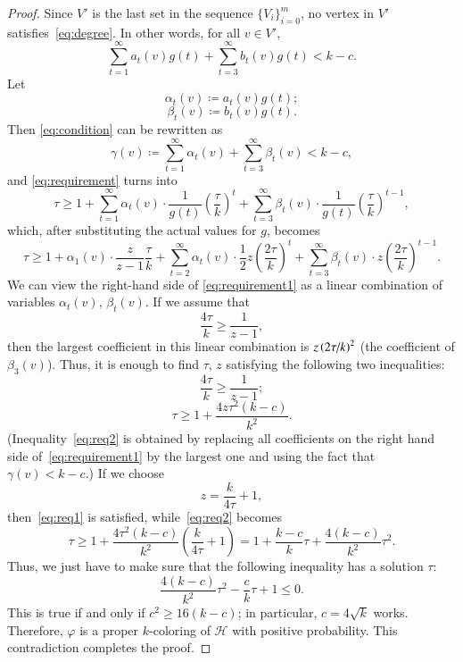 \documentclass[10pt]{article}
\numberwithin{equation}{subsection}
\theoremstyle{definition}
\begin{document}
\begin{proof}
		Since $V'$ is the last set in the sequence $\{V_i\}_{i = 0}^m$, no vertex in $V'$ satisfies~\eqref{eq:degree}. In other words, for all $v \in V'$,
		\begin{equation}\label{eq:condition}
			\sum_{t = 1}^\infty a_t(v) g(t) + \sum_{t = 3}^\infty b_t(v) g(t) < k-c.
		\end{equation}
		Let
		$$
			\alpha_t(v) \coloneqq a_t(v)g(t);
		$$
		$$
			\beta_t(v) \coloneqq b_t(v)g(t).
		$$
		Then \eqref{eq:condition} can be rewritten as
		$$
			\gamma(v) \coloneqq \sum_{t=1}^\infty \alpha_t(v) + \sum_{t=3}^\infty \beta_t(v) < k-c,
		$$
		and \eqref{eq:requirement} turns into
		$$
			\tau \geq 1 + \sum_{t = 1}^\infty \alpha_t(v) \cdot \frac{1}{g(t)}\left(\frac{\tau}{k}\right)^t + \sum_{t = 3}^\infty \beta_t(v)\cdot \frac{1}{g(t)}\left(\frac{\tau}{k}\right)^{t-1},
		$$
		which, after substituting the actual values for $g$, becomes
		\begin{equation}\label{eq:requirement1}
			\tau \geq 1 + \alpha_1(v) \cdot \frac{z}{z-1} \frac{\tau}{k} + \sum_{t = 2}^\infty \alpha_t(v) \cdot \frac{1}{2}z\left(\frac{2\tau}{k}\right)^t + \sum_{t = 3}^\infty \beta_t(v) \cdot z\left(\frac{2\tau}{k}\right)^{t-1}.
		\end{equation}
		We can view the right-hand side of \eqref{eq:requirement1} as a linear combination of variables $\alpha_t(v)$, $\beta_t(v)$. If we assume that
		$$
			\frac{4\tau}{k} \geq \frac{1}{z-1},
		$$
		then the largest coefficient in this linear combination is $z \left(2\tau\middle/k\right)^2$ (the coefficient of $\beta_3(v)$). Thus, it is enough to find $\tau$, $z$ satisfying the following two inequalities:
		\begin{equation}\label{eq:req1}
			\frac{4\tau}{k} \geq \frac{1}{z-1};
		\end{equation}	
		\begin{equation}\label{eq:req2}
			\tau \geq 1 + \frac{4z\tau^2 (k-c)}{k^2}.
		\end{equation}
		(Inequality~\eqref{eq:req2} is obtained by replacing all coefficients on the right hand side of~\eqref{eq:requirement1} by the largest one and using the fact that $\gamma(v) < k-c$.) If we choose
		$$
			z = \frac{k}{4\tau}+1,
		$$
		then~\eqref{eq:req1} is satisfied, while~\eqref{eq:req2} becomes
		$$
			\tau \geq 1 + \frac{4\tau^2(k-c)}{k^2} \left(\frac{k}{4\tau}+1\right) = 1 + \frac{k-c}{k} \tau + \frac{4(k-c)}{k^2}\tau^2.
		$$
		Thus, we just have to make sure that the following inequality has a solution $\tau$:
		$$
			\frac{4(k-c)}{k^2}\tau^2 - \frac{c}{k} \tau + 1 \leq 0.
		$$
		This is true if and only if $c^2 \geq 16(k-c)$; in particular, $c = 4\sqrt{k}$ works. Therefore, $\varphi$ is a proper $k$-coloring of $\mathcal{H}$ with positive probability. This contradiction completes the proof.
	 \end{proof}	 
	
\end{document}
